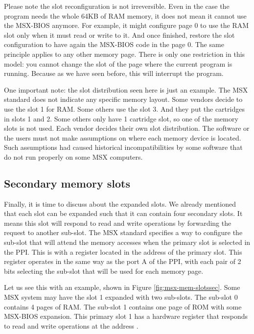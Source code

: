 Please note the slot reconfiguration is not irreversible. Even in the case the program needs the whole 64KB of RAM memory, it does not mean it cannot use the MSX-BIOS anymore. For example, it might configure page 0 to use the RAM slot only when it must read or write to it. And once finished, restore the slot configuration to have again the MSX-BIOS code in the page 0. The same principle applies to any other memory page. There is only one restriction in this model: you cannot change the slot of the page where the current program is running. Because as we have seen before, this will interrupt the program. 

One important note: the slot distribution seen here is just an example. The MSX standard does not indicate any specific memory layout. Some vendors decide to use the slot 1 for RAM. Some others use the slot 3. And they put the cartridges in slots 1 and 2. Some others only have 1 cartridge slot, so one of the memory slots is not used. Each vendor decides their own slot distribution. The software or the users must not make assumptions on where each memory device is located. Such assumptions had caused historical incompatibilities by some software that do not run properly on some MSX computers.

\subsection{Secondary memory slots}

Finally, it is time to discuss about the expanded slots. We already mentioned that each slot can be expanded such that it can contain four secondary slots. It means this slot will respond to read and write operations by forwarding the request to another sub-slot. The MSX standard specifies a way to configure the sub-slot that will attend the memory accesses when the primary slot is selected in the PPI. This is with a register located in the address  of the primary slot. This register operates in the same way as the port A of the PPI, with each pair of 2 bits selecting the sub-slot that will be used for each memory page. 

Let us see this with an example, shown in Figure \ref{fig:msx-mem-slotssec}. Some MSX system may have the slot 1 expanded with two sub-slots. The sub-slot 0 contains 4 pages of RAM. The sub-slot 1 contains one page of ROM with some MSX-BIOS expansion. This primary slot 1 has a hardware register that responds to read and write operations at the address . 


